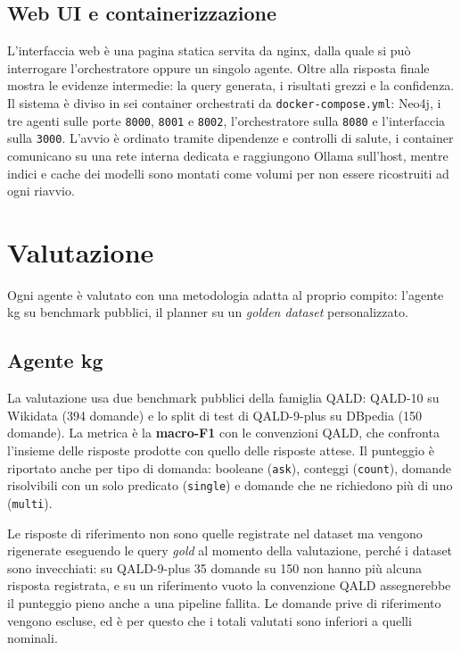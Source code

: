 \documentclass[11pt]{article}
\begin{document}
\subsection{Web UI e containerizzazione}

L'interfaccia web è una pagina statica servita da nginx, dalla quale si può interrogare l'orchestratore oppure un singolo agente. Oltre alla risposta finale mostra le evidenze intermedie: la query generata, i risultati grezzi e la confidenza. Il sistema è diviso in sei container orchestrati da \texttt{docker-compose.yml}: Neo4j, i tre agenti sulle porte \texttt{8000}, \texttt{8001} e \texttt{8002}, l'orchestratore sulla \texttt{8080} e l'interfaccia sulla \texttt{3000}. L'avvio è ordinato tramite dipendenze e controlli di salute, i container comunicano su una rete interna dedicata e raggiungono Ollama sull'host, mentre indici e cache dei modelli sono montati come volumi per non essere ricostruiti ad ogni riavvio.

\section{Valutazione}

Ogni agente è valutato con una metodologia adatta al proprio compito: l'agente kg su benchmark pubblici, il planner su un \textit{golden dataset} personalizzato.

\subsection{Agente kg}

La valutazione usa due benchmark pubblici della famiglia QALD: QALD-10 su Wikidata (394 domande) e lo split di test di QALD-9-plus su DBpedia (150 domande). La metrica è la \textbf{macro-F1} con le convenzioni QALD, che confronta l'insieme delle risposte prodotte con quello delle risposte attese. Il punteggio è riportato anche per tipo di domanda: booleane (\texttt{ask}), conteggi (\texttt{count}), domande risolvibili con un solo predicato (\texttt{single}) e domande che ne richiedono più di uno (\texttt{multi}).

Le risposte di riferimento non sono quelle registrate nel dataset ma vengono rigenerate eseguendo le query \textit{gold} al momento della valutazione, perché i dataset sono invecchiati: su QALD-9-plus 35 domande su 150 non hanno più alcuna risposta registrata, e su un riferimento vuoto la convenzione QALD assegnerebbe il punteggio pieno anche a una pipeline fallita. Le domande prive di riferimento vengono escluse, ed è per questo che i totali valutati sono inferiori a quelli nominali.
\end{document}

